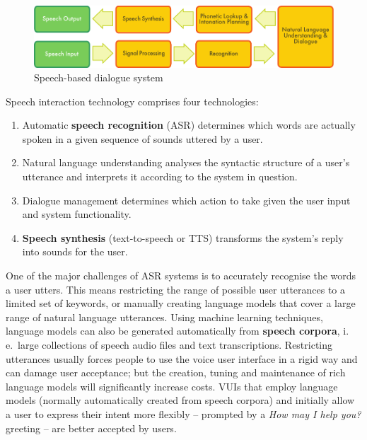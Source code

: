 \begin{multicols}{2}
\begin{figure}[htb]
  \center
  \includegraphics[width=\textwidth]{../_media/english/simple_speech-based_dialogue_architecture}
  \caption{Speech-based dialogue system}
  \label{fig:dialoguearch_en}
\end{figure}

Speech interaction technology comprises four technologies: 

\begin{enumerate}
\item Automatic \textbf{speech recognition} (ASR) determines which words are actually spoken in a given sequence of sounds uttered by a user.  
\item Natural language understanding analyses the syntactic structure of a user’s utterance and interprets it according to the system in question.
\item Dialogue management determines which action to take given the user input and system functionality.   
\item \textbf{Speech synthesis} (text-to-speech or TTS) transforms the system’s reply into sounds for the user.
\end{enumerate}

One of the major challenges of ASR systems is to accurately recognise the words a user utters. This means restricting the range of possible user utterances to a limited set of keywords, or manually creating language models that cover a large range of natural language utterances. Using machine learning techniques, language models can also be generated automatically from \textbf{speech corpora}, i.\,e.~large collections of speech audio files and text transcriptions. Restricting utterances usually forces people to use the voice user interface in a rigid way and can damage user acceptance; but the creation, tuning and maintenance of rich language models will significantly increase costs. VUIs that employ language models (normally automatically created from speech corpora) and initially allow a user to express their intent more flexibly -- prompted by a \textit{How may I help you?} greeting -- are better accepted by users.


\end{multicols}
